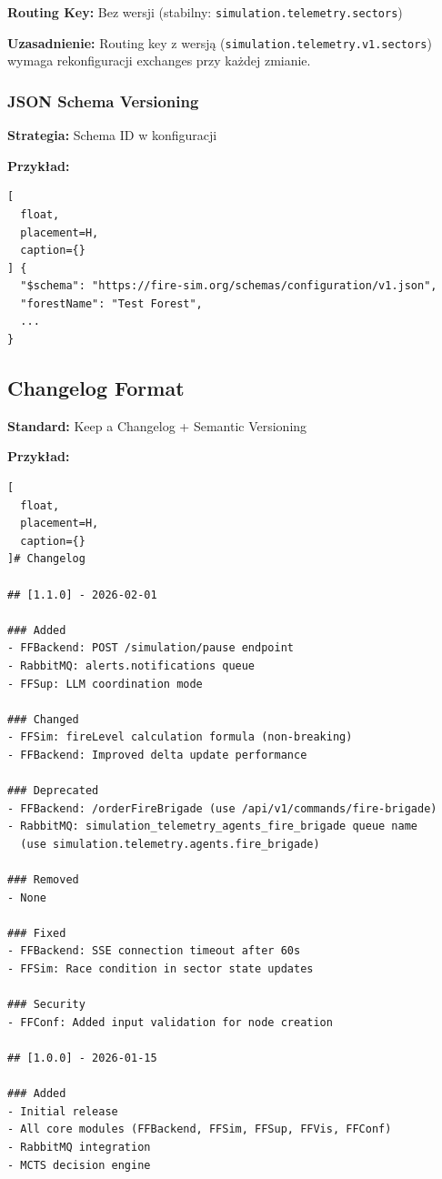 \documentclass[11pt,a4paper] {article}
\begin{document}
\textbf{Routing Key:} Bez wersji (stabilny: \texttt{simulation.telemetry.sectors})

\textbf{Uzasadnienie:} Routing key z wersją (\texttt{simulation.telemetry.v1.sectors}) wymaga rekonfiguracji exchanges przy każdej zmianie.

\subsubsection{JSON Schema Versioning}

\textbf{Strategia:} Schema ID w konfiguracji

\textbf{Przykład:}
\begin{lstlisting}[
  float,
  placement=H,
  caption={}
] {
  "$schema": "https://fire-sim.org/schemas/configuration/v1.json",
  "forestName": "Test Forest",
  ...
}
\end{lstlisting}

\subsection{Changelog Format}

\textbf{Standard:} Keep a Changelog + Semantic Versioning

\textbf{Przykład:}
\begin{lstlisting}[
  float,
  placement=H,
  caption={}
]# Changelog

## [1.1.0] - 2026-02-01

### Added
- FFBackend: POST /simulation/pause endpoint
- RabbitMQ: alerts.notifications queue
- FFSup: LLM coordination mode

### Changed
- FFSim: fireLevel calculation formula (non-breaking)
- FFBackend: Improved delta update performance

### Deprecated
- FFBackend: /orderFireBrigade (use /api/v1/commands/fire-brigade)
- RabbitMQ: simulation_telemetry_agents_fire_brigade queue name
  (use simulation.telemetry.agents.fire_brigade)

### Removed
- None

### Fixed
- FFBackend: SSE connection timeout after 60s
- FFSim: Race condition in sector state updates

### Security
- FFConf: Added input validation for node creation

## [1.0.0] - 2026-01-15

### Added
- Initial release
- All core modules (FFBackend, FFSim, FFSup, FFVis, FFConf)
- RabbitMQ integration
- MCTS decision engine
\end{lstlisting}
\end{document}
